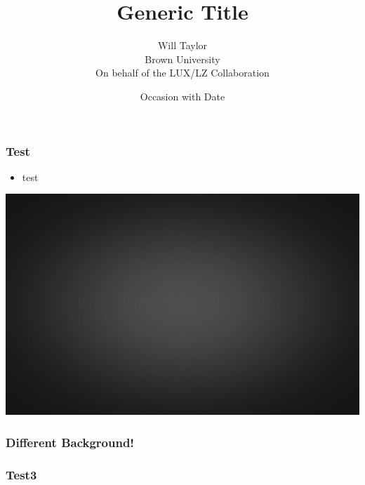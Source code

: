 \documentclass{beamer}
\title{Generic Title}
\date{Occasion with Date}
\author{Will Taylor \\
        Brown University \\
        On behalf of the LUX/LZ Collaboration}
\begin{document}
\begin{frame}
\titlepage
\end{frame}

\begin{frame}
    \frametitle{Test}
    \begin{itemize}
        \item{test}
    \end{itemize}
\end{frame}

{
{\includegraphics{images/simple_gray.jpg}}

\begin{frame}
    \frametitle{Different Background!}
\end{frame}
}

\begin{frame}
\frametitle{Test3}
\end{frame}
\end{document}
